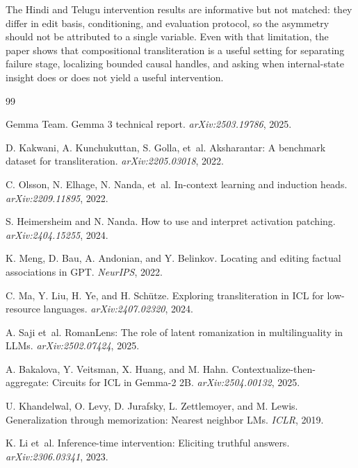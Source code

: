 \documentclass{article}
\begin{document}
The Hindi and Telugu intervention results are informative but not matched: they differ in edit basis, conditioning, and evaluation protocol, so the asymmetry should not be attributed to a single variable. Even with that limitation, the paper shows that compositional transliteration is a useful setting for separating failure stage, localizing bounded causal handles, and asking when internal-state insight does or does not yield a useful intervention.

\begin{thebibliography}{99}

Gemma Team. Gemma 3 technical report. \emph{arXiv:2503.19786}, 2025.

D. Kakwani, A. Kunchukuttan, S. Golla, et~al. Aksharantar: A benchmark dataset for transliteration. \emph{arXiv:2205.03018}, 2022.

C. Olsson, N. Elhage, N. Nanda, et~al. In-context learning and induction heads. \emph{arXiv:2209.11895}, 2022.

S. Heimersheim and N. Nanda. How to use and interpret activation patching. \emph{arXiv:2404.15255}, 2024.

K. Meng, D. Bau, A. Andonian, and Y. Belinkov. Locating and editing factual associations in GPT. \emph{NeurIPS}, 2022.

C. Ma, Y. Liu, H. Ye, and H. Sch\"utze. Exploring transliteration in ICL for low-resource languages. \emph{arXiv:2407.02320}, 2024.

A. Saji et~al. RomanLens: The role of latent romanization in multilinguality in LLMs. \emph{arXiv:2502.07424}, 2025.

A. Bakalova, Y. Veitsman, X. Huang, and M. Hahn. Contextualize-then-aggregate: Circuits for ICL in Gemma-2 2B. \emph{arXiv:2504.00132}, 2025.

U. Khandelwal, O. Levy, D. Jurafsky, L. Zettlemoyer, and M. Lewis. Generalization through memorization: Nearest neighbor LMs. \emph{ICLR}, 2019.

K. Li et~al. Inference-time intervention: Eliciting truthful answers. \emph{arXiv:2306.03341}, 2023.


\end{thebibliography}
\end{document}

